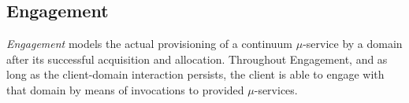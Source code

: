 






\subsection{Engagement}\label{sec:A3-E-engagement}

\textit{Engagement} models the actual provisioning of a continuum $\mu$-service by a domain after its successful acquisition and allocation.
Throughout Engagement, and as long as the client-domain interaction persists, the client is able to engage with that domain by means of invocations to provided $\mu$-services. 

